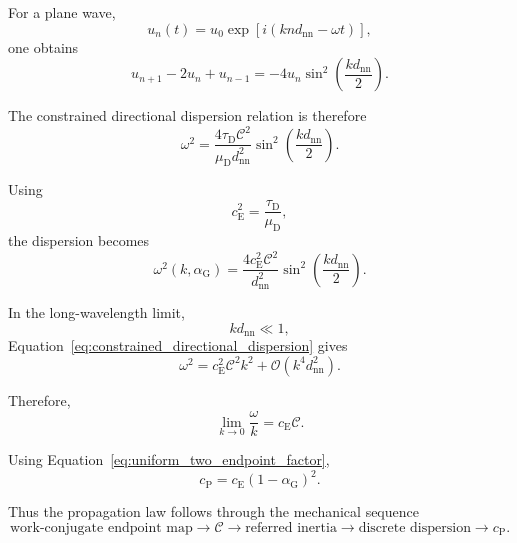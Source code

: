 For a plane wave,
\begin{equation}
    u_{n}(t) = u_{0} \exp \left[ i \left( knd_{\mathrm{nn}}-\omega t \right) \right],
\end{equation}
one obtains
\begin{equation}
    u_{n+1}-2u_{n}+u_{n-1} = -4u_{n} \sin^2 \left( \frac{kd_{\mathrm{nn}}}{2} \right).
\end{equation}

The constrained directional dispersion relation is therefore
\begin{equation}
    \omega^2 = \frac{ 4\tau_{\mathrm{D}}\mathcal{C}^2 }{ \mu_{\mathrm{D}}d_{\mathrm{nn}}^2 } \sin^2 \left( \frac{kd_{\mathrm{nn}}}{2} \right).
\end{equation}

Using
\begin{equation}
    c_{\mathrm{E}}^2 = \frac{\tau_{\mathrm{D}}}{\mu_{\mathrm{D}}},
\end{equation}
the dispersion becomes
\begin{equation}
    \omega^2 \left( k, \alpha_{\mathrm{G}} \right) = \frac{ 4c_{\mathrm{E}}^2\mathcal{C}^2 }{ d_{\mathrm{nn}}^2 } \sin^2 \left( \frac{kd_{\mathrm{nn}}}{2} \right).
    \label{eq:constrained_directional_dispersion}
\end{equation}

In the long-wavelength limit,
\begin{equation}
    kd_{\mathrm{nn}} \ll 1,
\end{equation}
Equation~\eqref{eq:constrained_directional_dispersion} gives
\begin{equation}
    \omega^2 = c_{\mathrm{E}}^2\mathcal{C}^2k^2 + \mathcal{O} \left( k^4d_{\mathrm{nn}}^2 \right).
\end{equation}

Therefore,
\begin{equation}
    \lim_{k\rightarrow0} \frac{\omega}{k} = c_{\mathrm{E}}\mathcal{C}.
    \label{eq:directional_longwave_speed}
\end{equation}

Using Equation~\eqref{eq:uniform_two_endpoint_factor},
\begin{equation}
    c_{\mathrm{P}} = c_{\mathrm{E}} \left( 1-\alpha_{\mathrm{G}} \right)^2.
    \label{eq:gravity_propagation_law}
\end{equation}

Thus the propagation law follows through the mechanical sequence
\begin{equation}
    \text{work-conjugate endpoint map} \longrightarrow \mathcal{C} \longrightarrow \text{referred inertia} \longrightarrow \text{discrete dispersion} \longrightarrow c_{\mathrm{P}}.
\end{equation}


